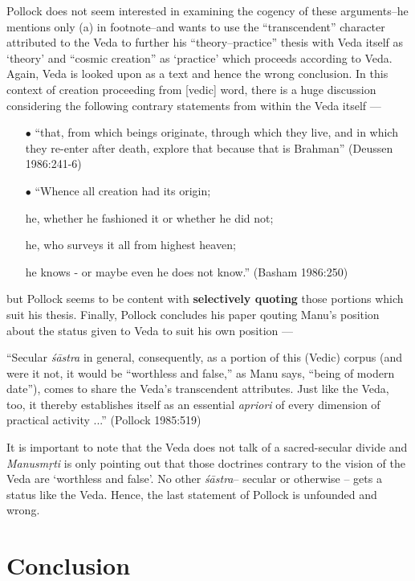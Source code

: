 Pollock does not seem interested in examining the cogency of these arguments--he mentions only (a) in footnote--and wants to use the ``transcendent'' character attributed to the Veda to further his ``theory–practice'' thesis with Veda itself as `theory' and ``cosmic creation'' as `practice' which proceeds according to Veda. Again, Veda is looked upon as a text and hence the wrong conclusion. In this context of creation proceeding from [vedic] word, there is a huge discussion considering the following contrary statements from within the Veda itself ---
\begin{itemize}
\item[$\bullet$] ``that, from which beings originate, through which they live, and in which they re-enter after death, explore that because that is Brahman'' (Deussen 1986:241-6)

\item[$\bullet$] ``Whence all creation had its origin; 

he, whether he fashioned it or whether he did not;

he, who surveys it all from highest heaven; 

he knows - or maybe even he does not know.'' (Basham 1986:250)
\end{itemize}
but Pollock seems to be content with {\bf selectively quoting} those portions which suit his thesis. Finally, Pollock concludes his paper qouting Manu's position about the status given to Veda to suit his own position ---
\begin{myquote}
``Secular {\sl śāstra} in general, consequently, as a portion of this (Vedic) corpus (and were it not, it would be ``worthless and false,'' as Manu says, ``being of modern date''), comes to share the Veda's transcendent attributes. Just like the Veda, too, it thereby establishes itself as an essential {\sl apriori} of every dimension of practical activity ...'' (Pollock 1985:519)
\end{myquote}

It is important to note that the Veda does not talk of a sacred-secular divide and {\sl Manusmṛti} is only pointing out that those doctrines contrary to the vision of the Veda are `worthless and false'. No other {\sl śāstra}-- secular or otherwise -- gets a status like the Veda. Hence, the last statement of Pollock is unfounded and wrong.

\section{Conclusion}\label{art12-sec4}

